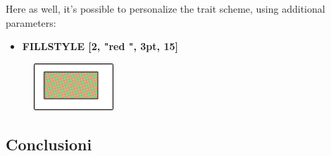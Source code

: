 \vskip 1cm

Here as well, it's possible to personalize the trait scheme, using additional parameters:

\vskip 1cm

\begin{scriptsize}
\begin{minipage}{0.50\textwidth}
\begin{itemize}[itemsep=-3pt,parsep=2pt]
\item[] \textbf{FILLSTYLE [2,  "red ", 3pt, 15\degree]}           
\end{itemize}
\end{minipage}
\end{scriptsize}
\begin{minipage}{0.3\textwidth}
\begin{figure}[H]
   \includegraphics[width=3.0cm,trim=4 4 8 4,clip]{./images/disegnare/disegnare-41.png}
   \label{dis-42}
\end{figure}
\end{minipage} \hfill

\vskip 1cm

\subsection{Conclusioni}

